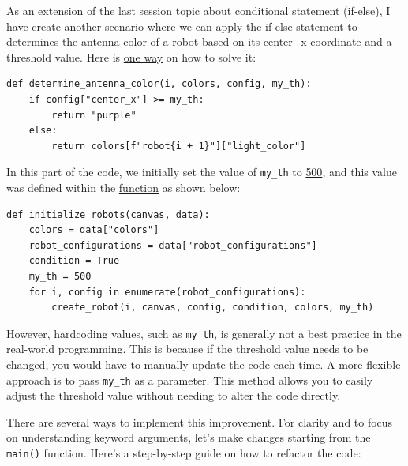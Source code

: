 As an extension of the last session topic about conditional statement (if-else), I have create another scenario where we can apply the if-else statement to determines the antenna color of a robot based on its center\_x coordinate and a threshold value. Here is \href{https://github.com/balandongiv/computer_programming_gist/blob/main/session5/session5_robot_template.py#L43}{one way} on how to solve it:

\begin{verbatim}
def determine_antenna_color(i, colors, config, my_th):
    if config["center_x"] >= my_th:
        return "purple"
    else:
        return colors[f"robot{i + 1}"]["light_color"]
\end{verbatim}

In this part of the code, we initially set the value of \texttt{my\_th} to \href{https://github.com/balandongiv/computer_programming_gist/blob/main/session5/session5_robot_template.py#L135}{500}, and this value was defined within the \href{https://github.com/balandongiv/computer_programming_gist/blob/main/session5/session5_robot_template.py#L121}{function} as shown below:

\begin{verbatim}
def initialize_robots(canvas, data):
    colors = data["colors"]
    robot_configurations = data["robot_configurations"]
    condition = True
    my_th = 500
    for i, config in enumerate(robot_configurations):
        create_robot(i, canvas, config, condition, colors, my_th)
\end{verbatim}
However, hardcoding values, such as \texttt{my\_th}, is generally not a best practice in the real-world programming. This is because if the threshold value needs to be changed, you would have to manually update the code each time. A more flexible approach is to pass \texttt{my\_th} as a parameter. This method allows you to easily adjust the threshold value without needing to alter the code directly.

There are several ways to implement this improvement. For clarity and to focus on understanding keyword arguments, let's make changes starting from the \texttt{main()} function. Here's a step-by-step guide on how to refactor the code:

